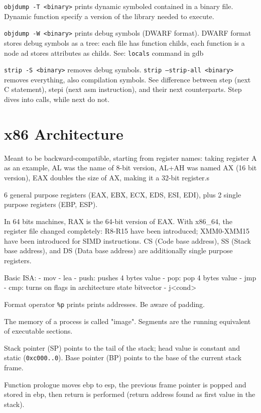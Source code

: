 \texttt{objdump -T <binary>} prints dynamic symboled contained in a binary file.
Dynamic function specify a version of the library needed to execute.

\texttt{objdump -W <binary>} prints debug symbols (DWARF format).
DWARF format stores debug symbols as a tree: each file has function childs, each function is a node ad stores attributes as childs.
See: \texttt{locals} command in gdb

\texttt{strip -S <binary>} removes debug symbols. \texttt{strip --strip-all <binary>} removes everything, also compilation symbols.
See difference between step (next C statement), stepi (next asm instruction), and their next counterparts. Step dives into calls, while next do not.

\section{x86 Architecture}
Meant to be backward-compatible, starting from register names: taking register A as an example, AL was the name of 8-bit version, AL+AH was named AX (16 bit version), EAX doubles the size of AX, making it a 32-bit register.s

6 general purpose registers (EAX, EBX, ECX, EDS, ESI, EDI), plus 2 single purpose registers (EBP, ESP).

In 64 bits machines, RAX is the 64-bit version of EAX. With x86_64, the register file changed completely: R8-R15 have been introduced; XMM0-XMM15 have been introduced for SIMD instructions.
CS (Code base address), SS (Stack base address), and DS (Data base address) are additionally single purpose registers.

Basic ISA:
- mov
- lea
- push: pushes 4 bytes value
- pop: pop 4 bytes value
- jmp
- cmp: turns on flags in architecture state bitvector
- j<cond>

Format operator \texttt{\%p} prints prints addresses. Be aware of padding.

The memory of a process is called "image". Segments are the running equivalent of executable sections.

Stack pointer (SP) points to the tail of the stack; head value is constant and static (\texttt{0xc000..0}).
Base pointer (BP) points to the base of the current stack frame.

Function prologue moves ebp to esp, the previous frame pointer is popped and stored in ebp, then return is performed (return address found as first value in the stack).

